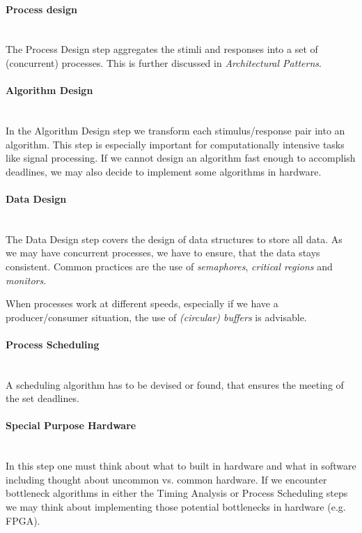 \documentclass[10pt,a4paper,titlepage,draft]{scrartcl} %
\begin{document}
\paragraph{Process design} \ \\
The Process Design step aggregates the stimli and responses into a set of (concurrent) processes.
This is further discussed in \emph{Architectural Patterns}.

\paragraph{Algorithm Design} \ \\
In the Algorithm Design step we transform each stimulus/response pair into an algorithm.
This step is especially important for computationally intensive tasks like signal processing.
If we cannot design an algorithm fast enough to accomplish deadlines, we may also decide to implement some algorithms in hardware.

\paragraph{Data Design} \ \\
The Data Design step covers the design of data structures to store all data.
As we may have concurrent processes, we have to ensure, that the data stays consistent.
Common practices are the use of \emph{semaphores}, \emph{critical regions} and \emph{monitors}.

When processes work at different speeds, especially if we have a pro\-du\-cer/con\-sumer situation, the use of \emph{(circular) buffers} is advisable.

\paragraph{Process Scheduling} \ \\
A scheduling algorithm has to be devised or found, that ensures the meeting of the set deadlines.

\paragraph{Special Purpose Hardware} \ \\
In this step one must think about what to built in hardware and what in software including thought about uncommon vs. common hardware.
If we encounter bottleneck algorithms in either the Timing Analysis or Process Scheduling steps we may think about implementing those potential bottlenecks in hardware (e.g. FPGA).
\end{document}
